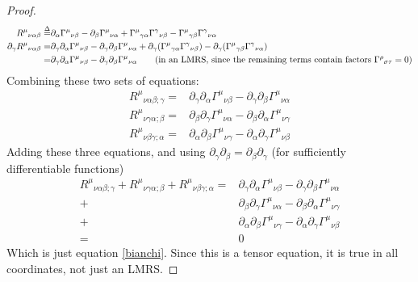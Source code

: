 \documentclass[10pt,a4paper]{article}
\begin{document}
\begin{proof}
			\begin{align}
			{R^\mu}_{\nu\alpha\beta}\overset{\Delta}{=}&\partial_{\alpha}{\Gamma^\mu}_{\nu\beta}-\partial_{\beta}{\Gamma^\mu}_{\nu\alpha}+{\Gamma^\mu}_{\gamma\alpha}{\Gamma^\gamma}_{\nu\beta}-{\Gamma^\mu}_{\gamma\beta}{\Gamma^\gamma}_{\nu\alpha} \\
			\partial_{\gamma}{R^\mu}_{\nu\alpha\beta} =& \partial_{\gamma}\partial_{\alpha}{\Gamma^\mu}_{\nu\beta}-\partial_{\gamma}\partial_{\beta}{\Gamma^\mu}_{\nu\alpha}+\partial_{\gamma}({\Gamma^\mu}_{\gamma\alpha}{\Gamma^\gamma}_{\nu\beta})-\partial_{\gamma}({\Gamma^\mu}_{\gamma\beta}{\Gamma^\gamma}_{\nu\alpha})\\
			=&\partial_{\gamma}\partial_{\alpha}{\Gamma^\mu}_{\nu\beta}-\partial_{\gamma}\partial_{\beta}{\Gamma^\mu}_{\nu\alpha} \tag{in an LMRS, since the remaining terms contain factors ${\Gamma^{\rho}}_{\sigma\tau}=0$}
			\end{align}
			Combining these two sets of equations:
			\begin{align}
			{R^\mu}_{\nu\alpha\beta;\gamma} =& \partial_{\gamma}\partial_{\alpha}{\Gamma^\mu}_{\nu\beta}-\partial_{\gamma}\partial_{\beta}{\Gamma^\mu}_{\nu\alpha} \\
			{R^\mu}_{\nu\gamma\alpha;\beta} =& \partial_{\beta}\partial_{\gamma}{\Gamma^\mu}_{\nu\alpha}-\partial_{\beta}\partial_{\alpha}{\Gamma^\mu}_{\nu\gamma} \\
			{R^\mu}_{\nu\beta\gamma;\alpha} =& \partial_{\alpha}\partial_{\beta}{\Gamma^\mu}_{\nu\gamma}-\partial_{\alpha}\partial_{\gamma}{\Gamma^\mu}_{\nu\beta}
			\end{align}
			Adding these three equations, and using $\partial_{\gamma}\partial_{\beta}=\partial_{\beta}\partial_{\gamma}$ (for sufficiently differentiable functions)
			\begin{align}
			{R^\mu}_{\nu\alpha\beta;\gamma} + {R^\mu}_{\nu\gamma\alpha;\beta} +  {R^\mu}_{\nu\beta\gamma;\alpha} =& \partial_{\gamma}\partial_{\alpha}{\Gamma^\mu}_{\nu\beta}-\partial_{\gamma}\partial_{\beta}{\Gamma^\mu}_{\nu\alpha} \\
			+& \partial_{\beta}\partial_{\gamma}{\Gamma^\mu}_{\nu\alpha}-\partial_{\beta}\partial_{\alpha}{\Gamma^\mu}_{\nu\gamma} \\
			+&
			\partial_{\alpha}\partial_{\beta}{\Gamma^\mu}_{\nu\gamma}-\partial_{\alpha}\partial_{\gamma}{\Gamma^\mu}_{\nu\beta} \\
			=& 0
			\end{align}
			Which is just equation \ref{bianchi}. Since this is a tensor equation, it is true in all coordinates, not just an LMRS.
		\end{proof}
\end{document}
